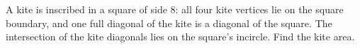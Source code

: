 A kite is inscribed in a square of side $8$: all four kite vertices lie on the square boundary, and one full diagonal of the kite is a diagonal of the square. The intersection of the kite diagonals lies on the square's incircle. Find the kite area.
